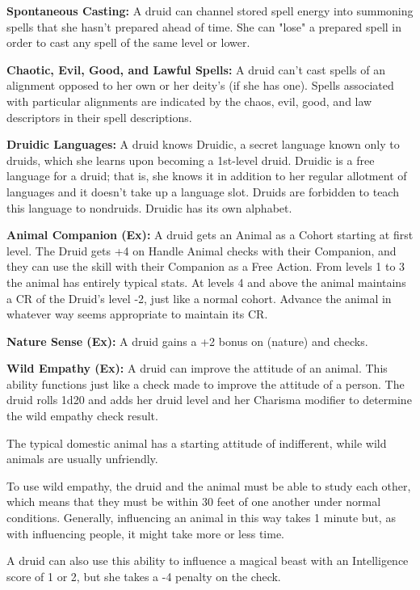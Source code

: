 \textbf{Spontaneous Casting:} A druid can channel stored spell energy into summoning spells that she hasn't prepared ahead of time. She can "lose" a prepared spell in order to cast any  spell of the same level or lower.

\textbf{Chaotic, Evil, Good, and Lawful Spells:} A druid can't cast spells of an alignment opposed to her own or her deity's (if she has one). Spells associated with particular alignments are indicated by the chaos, evil, good, and law descriptors in their spell descriptions.

\textbf{Druidic Languages:} A druid knows Druidic, a secret language known only to druids, which she learns upon becoming a 1st-level druid. Druidic is a free language for a druid; that is, she knows it in addition to her regular allotment of languages and it doesn't take up a language slot. Druids are forbidden to teach this language to nondruids. Druidic has its own alphabet.

\textbf{Animal Companion (Ex):} A druid gets an Animal as a Cohort starting at first level. The Druid gets +4 on Handle Animal checks with their Companion, and they can use the skill with their Companion as a Free Action. From levels 1 to 3 the animal has entirely typical stats. At levels 4 and above the animal maintains a CR of the Druid's level -2, just like a normal cohort. Advance the animal in whatever way seems appropriate to maintain its CR.

\textbf{Nature Sense (Ex):} A druid gains a +2 bonus on  (nature) and  checks.

\textbf{Wild Empathy (Ex):} A druid can improve the attitude of an animal. This ability functions just like a  check made to improve the attitude of a person. The druid rolls 1d20 and adds her druid level and her Charisma modifier to determine the wild empathy check result.

The typical domestic animal has a starting attitude of indifferent, while wild animals are usually unfriendly.

To use wild empathy, the druid and the animal must be able to study each other, which means that they must be within 30 feet of one another under normal conditions. Generally, influencing an animal in this way takes 1 minute but, as with influencing people, it might take more or less time.

A druid can also use this ability to influence a magical beast with an Intelligence score of 1 or 2, but she takes a -4 penalty on the check.

